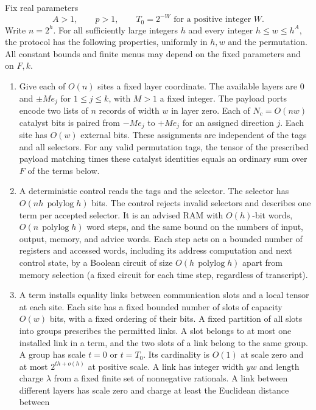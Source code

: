 \begin{definition}\label{def:protocol}
Fix real parameters
\[
 A>1,\qquad p>1,\qquad T_0=2^{-W}\text{ for a positive integer $W$}.
\]
Write \(n=2^h\). For all sufficiently large integers \(h\) and every integer
\(h\le w\le h^A\), the protocol has the following properties, uniformly in
\(h,w\) and the permutation. All constant bounds and finite menus may depend
on the fixed parameters and on \(F,k\).
\begin{enumerate}
\item Give each of \(O(n)\) sites a fixed layer coordinate. The available
layers are \(0\) and \(\pm M e_j\) for \(1\le j\le k\), with \(M>1\) a fixed integer.
The payload ports encode two lists of \(n\) records of width \(w\) in layer
zero. Each of \(N_c=O(nw)\) catalyst bits is paired from \(-M e_j\) to
\(+M e_j\) for an assigned direction \(j\). Each site has \(O(w)\) external
bits. These assignments are independent of the tags and all selectors.
For any valid permutation tags, the tensor of the prescribed payload
matching times these catalyst identities equals an ordinary sum over \(F\)
of the terms below.
\item A deterministic control reads the tags and the selector.
The selector has \(O(nh\,\operatorname{polylog}h)\) bits. The control rejects
invalid selectors and describes one term per accepted selector. It is an advised RAM with
\(O(h)\)-bit words, \(O(n\,\operatorname{polylog} h)\) word steps, and the
same bound on the numbers of input, output, memory, and advice words. Each
step acts on a bounded number of registers and accessed words, including
its address computation and next control state, by a Boolean circuit of
size \(O(h\,\operatorname{polylog}h)\) apart from memory selection (a fixed circuit for each time step, regardless of transcript).
\item A term installs equality links between communication slots and a
local tensor at each site. Each site has a fixed bounded number of slots of
capacity \(O(w)\) bits, with a fixed ordering of their bits. A fixed
partition of all slots into groups prescribes the permitted links.
A slot belongs to at most one installed link in a term, and the two
slots of a link belong to the same group. A group has scale \(t=0\) or
\(t=T_0\). Its cardinality is
\(O(1)\) at scale zero and at most \(2^{th+o(h)}\) at positive scale.
A link has integer width \(yw\) and length charge \(\lambda\) from a
fixed finite set of nonnegative rationals. A link between different
layers has scale zero and charge at least the Euclidean distance between

\end{enumerate}
\end{definition}
